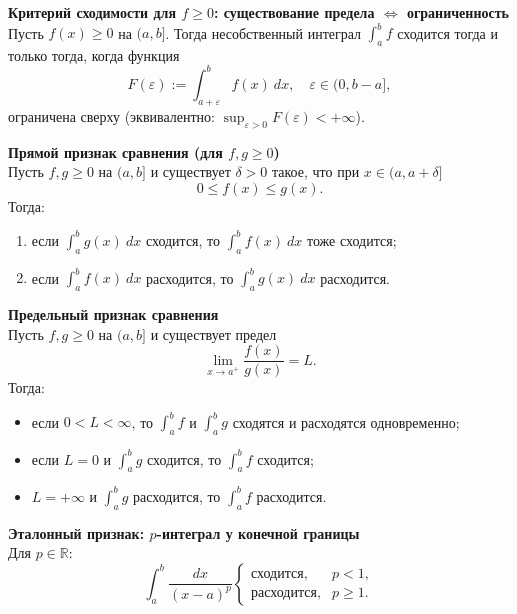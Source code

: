 \documentclass[14pt]{extreport}
\begin{document}
    \begin{theorem}
        \textbf{Критерий сходимости для $f \geq 0$: существование предела $\Leftrightarrow$ ограниченность}\\
        Пусть $f(x) \geq 0$ на $(a,b]$. Тогда несобственный интеграл $\int_a^b f$ сходится тогда и только тогда, когда функция
        \[
        F(\varepsilon) := \int_{a+\varepsilon}^b f(x)\ dx, \quad \varepsilon \in (0,b-a],
        \]
        ограничена сверху (эквивалентно: $\sup_{\varepsilon>0} F(\varepsilon) < +\infty$).
    \end{theorem}

    \begin{theorem}
        \textbf{Прямой признак сравнения (для $f,g \geq 0$)}\\
        Пусть $f,g \geq 0$ на $(a,b]$ и существует $\delta>0$ такое, что при $x \in (a,a+\delta]$
        \[
        0 \leq f(x) \leq g(x).
        \]
        Тогда:
        \begin{enumerate}
            \item если $\int_a^b g(x)\ dx$ сходится, то $\int_a^b f(x)\ dx$ тоже сходится;
            \item если $\int_a^b f(x)\ dx$ расходится, то $\int_a^b g(x)\ dx$ расходится.
        \end{enumerate}
    \end{theorem}

    \begin{theorem}
        \textbf{Предельный признак сравнения}\\
        Пусть $f,g \geq 0$ на $(a,b]$ и существует предел
        \[
        \lim_{x \rightarrow a^+} \frac{f(x)}{g(x)} = L.
        \]
        Тогда:
        \begin{itemize}
            \item если $0 < L < \infty$, то $\int_a^b f$ и $\int_a^b g$ сходятся и расходятся одновременно;
            \item если $L = 0$ и $\int_a^b g$ сходится, то $\int_a^b f$ сходится;
            \item $L = +\infty$ и $\int_a^b g$ расходится, то $\int_a^b f$ расходится.
        \end{itemize}
    \end{theorem}

    \begin{theorem}
        \textbf{Эталонный признак: $p$-интеграл у конечной границы}\\
        Для $p \in \mathbb{R}$:
        \[
        \int_a^b \frac{dx}{(x-a)^p}
        \begin{cases}
            \text{сходится}, & p<1, \\
            \text{расходится}, & p \geq 1.
        \end{cases}
        \]
    \end{theorem}
\end{document}
